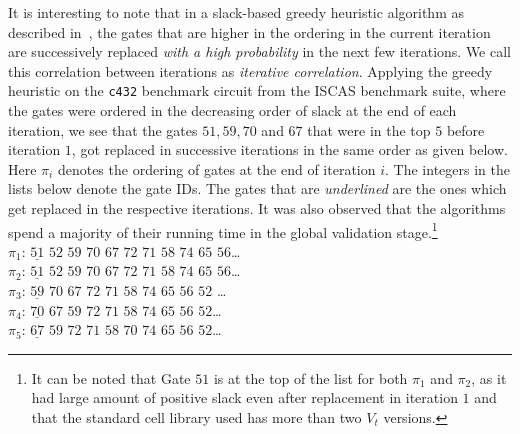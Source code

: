 \noindent It is interesting to note that in a slack-based greedy heuristic algorithm as described in~\cite{mok:12}, the gates that are higher in the ordering in the current iteration are successively replaced {\it with a high probability} in the next few iterations. We call this correlation between iterations as {\it iterative correlation}. Applying the greedy heuristic on the \texttt{c432} benchmark circuit from the ISCAS benchmark suite, where the gates were ordered in the decreasing order of slack at the end of each iteration, we see that the gates $51, 59, 70$ and $67$ that were in the top $5$ before iteration $1$, got replaced in successive iterations in the same order as given below. Here $\pi_i$ denotes the ordering of gates at the end of iteration $i$. The integers in the lists below denote the gate IDs. The gates that are {\it underlined} are the ones which get replaced in the respective iterations. It was also observed that the algorithms spend a majority of their running time in the global validation stage.\footnote{It can be noted that Gate $51$ is at the top of the list for both $\pi_1$ and $\pi_2$, as it had large amount of positive slack even after replacement in iteration $1$ and that the standard cell library used has more than two $V_t$ versions.} 
\vspace{0.1cm}
% 
% 
\\
\noindent $\pi_1$: $\underline{51}$  $52$  $59$ $70$ $67$ $72$ $71$ $58$ $74$ $65$ $56$\ldots\\
$\pi_2$: $\underline{51}$ $52$ $59$ $70$ $67$ $72$ $71$ $58$ $74$ $65$ $56$\ldots\\
$\pi_3$: $\underline{59}$ $70$ $67$ $72$ $71$ $58$ $74$ $65$ $56$ $52$ \ldots\\
$\pi_4$: $\underline{70}$ $67$ $59$ $72$ $71$ $58$ $74$ $65$ $56$ $52$\ldots\\
$\pi_5$: $\underline{67}$ $59$ $72$ $71$ $58$ $70$ $74$ $65$ $56$ $52$\ldots

\vspace{0.1cm}

